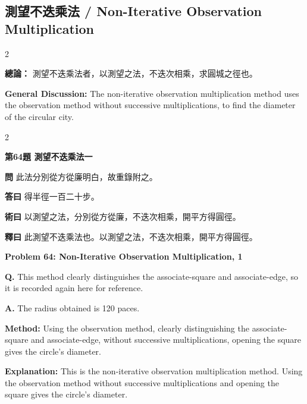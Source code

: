 \documentclass[11pt,a4paper]{article}
\newcommand{\wen}[1]{\noindent\textbf{問} #1\par\smallskip}
\newcommand{\da}[1]{\noindent\textbf{答曰} #1\par\smallskip}
\newcommand{\shu}[1]{\noindent\textbf{術曰} #1\par\smallskip}
\newcommand{\shi}[1]{\noindent\textbf{釋曰} #1\par\smallskip}
\newcommand{\wenE}[1]{\noindent\textbf{Q.} #1\par\smallskip}
\newcommand{\daE}[1]{\noindent\textbf{A.} #1\par\smallskip}
\newcommand{\shuE}[1]{\noindent\textbf{Method:} #1\par\smallskip}
\newcommand{\shiE}[1]{\noindent\textbf{Explanation:} #1\par\smallskip}
\begin{document}
\subsection*{測望不迭乘法 / Non-Iterative Observation Multiplication}

\begin{paracol}{2}

\noindent\textbf{總論：} 測望不迭乘法者，以測望之法，不迭次相乘，求圓城之徑也。

\switchcolumn

\noindent\textbf{General Discussion:} The non-iterative observation multiplication method uses the observation method without successive multiplications, to find the diameter of the circular city.

\end{paracol}

\bigskip

\begin{paracol}{2}

\noindent\textbf{第64題 測望不迭乘法一}

\wen{此法分別從方從廉明白，故重錄附之。}
\da{得半徑一百二十步。}
\shu{以測望之法，分別從方從廉，不迭次相乘，開平方得圓徑。}
\shi{此測望不迭乘法也。以測望之法，不迭次相乘，開平方得圓徑。}

\switchcolumn

\noindent\textbf{Problem 64: Non-Iterative Observation Multiplication, 1}

\wenE{This method clearly distinguishes the associate-square and associate-edge, so it is recorded again here for reference.}
\daE{The radius obtained is 120 paces.}
\shuE{Using the observation method, clearly distinguishing the associate-square and associate-edge, without successive multiplications, opening the square gives the circle's diameter.}
\shiE{This is the non-iterative observation multiplication method. Using the observation method without successive multiplications and opening the square gives the circle's diameter.}

\end{paracol}

\clearpage

\end{document}

